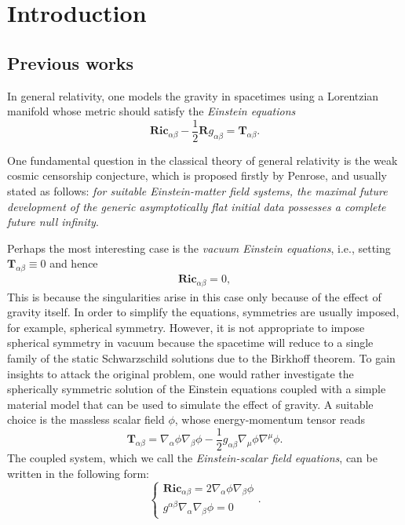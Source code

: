 \documentclass[11pt,reqno]{amsart}
\theoremstyle{definition}
\numberwithin{equation}{section}
\begin{document}
\tableofcontents

\setcounter{tocdepth}{1}


\allowdisplaybreaks

\section{Introduction}
\subsection{Previous works}
In general relativity, one models the gravity in spacetimes using a Lorentzian manifold whose metric should satisfy the \emph{Einstein equations}
$$\mathbf{Ric}_{\alpha\beta}-\frac{1}{2}\mathbf{R}g_{\alpha\beta}=\mathbf{T}_{\alpha\beta}.$$

One fundamental question in the classical theory of general relativity is the weak cosmic censorship conjecture, which is proposed firstly by Penrose, and usually stated as follows: \emph{for suitable Einstein-matter field systems, the maximal future development of the generic asymptotically flat initial data possesses a complete future null infinity}. 

Perhaps the most interesting case is the \emph{vacuum Einstein equations}, i.e., setting $\mathbf{T}_{\alpha\beta}\equiv0$ and hence
\begin{align*}
\mathbf{Ric}_{\alpha\beta}=0,
\end{align*} 
This is because the singularities arise in this case only because of the effect of gravity itself. In order to simplify the equations, symmetries are usually imposed, for example, spherical symmetry. However, it is not appropriate to impose spherical symmetry in vacuum because the spacetime will reduce to a single family of the static Schwarzschild solutions due to the Birkhoff theorem. To gain insights to attack the original problem, one would rather investigate the spherically symmetric solution of the Einstein equations coupled with a simple material model that can be used to simulate the effect of gravity. A suitable choice is the massless scalar field $\phi$,  whose energy-momentum tensor reads
$$\mathbf{T}_{\alpha\beta}=\nabla_\alpha\phi\nabla_\beta\phi-\frac{1}{2}g_{\alpha\beta}\nabla_\mu\phi\nabla^\mu\phi.$$
The coupled system, which we call the \emph{Einstein-scalar field equations}, can be written in the following form:
$$\begin{cases}\mathbf{Ric}_{\alpha\beta}=2\nabla_\alpha\phi\nabla_\beta\phi\\
g^{\alpha\beta}\nabla_{\alpha}\nabla_{\beta}\phi=0
\end{cases}.$$
\end{document}
